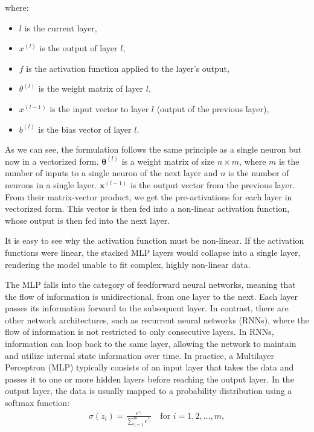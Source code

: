 where:
\begin{itemize}
    \item \( l \) is the current layer,
    \item \( x^{(l)} \) is the output of layer \( l \),
    \item \( f \) is the activation function applied to the layer's output,
    \item \( \theta^{(l)} \) is the weight matrix of layer \( l \),
    \item \( x^{(l-1)} \) is the input vector to layer \( l \) (output of the previous layer),
    \item \( b^{(l)} \) is the bias vector of layer \( l \).
\end{itemize}
As we can see, the formulation follows the same principle as a single neuron but now in a vectorized form. 
\( \mathbf{\theta}^{(l)}  \) is a weight matrix of size \( n \times m \), where \( m \) is the number of inputs to a single neuron of the next layer and \( n \) is the number of neurons in a single layer.
\( \mathbf{x}^{(l-1)} \) is the output vector from the previous layer.
From their matrix-vector product, we get the pre-activations for each layer in vectorized form.
This vector is then fed into a non-linear activation function, whose output is then fed into the next layer.

It is easy to see why the activation function must be non-linear.
If the activation functions were linear, the stacked MLP layers would collapse into a single layer,
rendering the model unable to fit complex, highly non-linear data.\cite{Goodfellow-et-al-2016}

The MLP falls into the category of feedforward neural networks, meaning that the flow of information is unidirectional,
from one layer to the next. Each layer passes its information forward to the subsequent layer.
In contrast, there are other network architectures, such as recurrent neural networks (RNNs),
where the flow of information is not restricted to only consecutive layers. In RNNs, information can loop back to the same layer, 
allowing the network to maintain and utilize internal state information over time.
In practice, a Multilayer Perceptron (MLP) typically consists of an input layer that takes the data 
and passes it to one or more hidden layers before reaching the output layer.
In the output layer, the data is usually mapped to a probability distribution using a softmax function:
\begin{align}
\sigma(z_i) = \frac{e^{z_i}}{\sum_{j=1}^{m} e^{z_j}} \quad \text{for } i = 1, 2, \ldots, m ,
\end{align}

